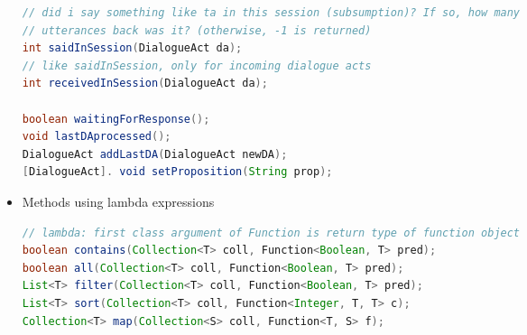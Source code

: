 \begin{itemize}
\begin{lstlisting}[language=Java]
// did i say something like ta in this session (subsumption)? If so, how many
// utterances back was it? (otherwise, -1 is returned)
int saidInSession(DialogueAct da);
// like saidInSession, only for incoming dialogue acts
int receivedInSession(DialogueAct da);

boolean waitingForResponse();
void lastDAprocessed();
DialogueAct addLastDA(DialogueAct newDA);
[DialogueAct]. void setProposition(String prop);
\end{lstlisting}

\item Methods using lambda expressions
\begin{lstlisting}[language=Java]
// lambda: first class argument of Function is return type of function object
boolean contains(Collection<T> coll, Function<Boolean, T> pred);
boolean all(Collection<T> coll, Function<Boolean, T> pred);
List<T> filter(Collection<T> coll, Function<Boolean, T> pred);
List<T> sort(Collection<T> coll, Function<Integer, T, T> c);
Collection<T> map(Collection<S> coll, Function<T, S> f);
\end{lstlisting}

\end{itemize}

